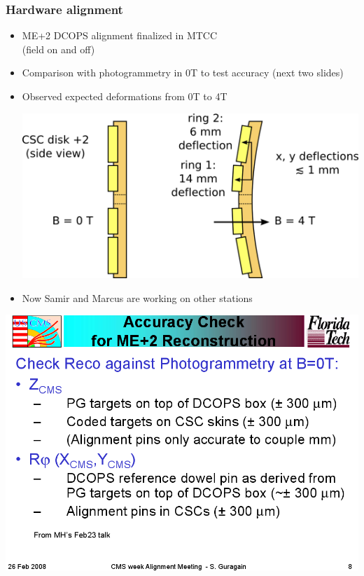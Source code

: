 \documentclass[compress]{beamer}
\begin{document}
\begin{frame}
\frametitle{Hardware alignment}
\large
\begin{itemize}\setlength{\itemsep}{0.2 cm}
\item ME+2 DCOPS alignment finalized in MTCC \\ (field on and off)
\item Comparison with photogrammetry in 0T to test accuracy (next two slides)
\item Observed expected deformations from 0T to 4T
\begin{center}
\includegraphics[width=0.8\linewidth]{deflections.png}
\end{center}
\item Now Samir and Marcus are working on other stations
\end{itemize}
\end{frame}

\begin{frame}
\mbox{\hspace{-1 cm}\includegraphics[width=1.2\linewidth]{samirs_plots2.png}}
\end{frame}
\end{document}
